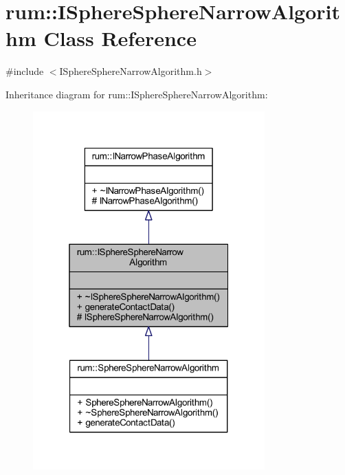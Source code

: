 \hypertarget{classrum_1_1_i_sphere_sphere_narrow_algorithm}{}\section{rum\+:\+:I\+Sphere\+Sphere\+Narrow\+Algorithm Class Reference}
\label{classrum_1_1_i_sphere_sphere_narrow_algorithm}


{\ttfamily \#include $<$I\+Sphere\+Sphere\+Narrow\+Algorithm.\+h$>$}



Inheritance diagram for rum\+:\+:I\+Sphere\+Sphere\+Narrow\+Algorithm\+:\nopagebreak
\begin{figure}[H]
\begin{center}
\leavevmode
\includegraphics[width=253pt]{classrum_1_1_i_sphere_sphere_narrow_algorithm__inherit__graph}
\end{center}
\end{figure}


